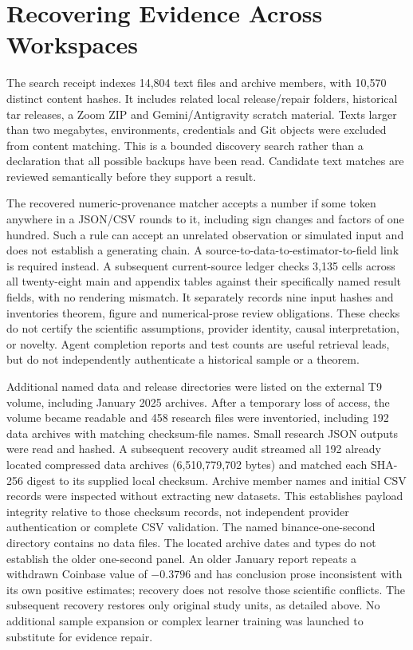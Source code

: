\section{Recovering Evidence Across Workspaces}
The search receipt indexes 14,804 text files and archive members, with 10,570 distinct content hashes. It includes related local release/repair folders, historical tar releases, a Zoom ZIP and Gemini/Antigravity scratch material. Texts larger than two megabytes, environments, credentials and Git objects were excluded from content matching. This is a bounded discovery search rather than a declaration that all possible backups have been read. Candidate text matches are reviewed semantically before they support a result.

The recovered numeric-provenance matcher accepts a number if some token anywhere in a JSON/CSV rounds to it, including sign changes and factors of one hundred. Such a rule can accept an unrelated observation or simulated input and does not establish a generating chain. A source-to-data-to-estimator-to-field link is required instead. A subsequent current-source ledger checks 3,135 cells across all twenty-eight main and appendix tables against their specifically named result fields, with no rendering mismatch. It separately records nine input hashes and inventories theorem, figure and numerical-prose review obligations. These checks do not certify the scientific assumptions, provider identity, causal interpretation, or novelty. Agent completion reports and test counts are useful retrieval leads, but do not independently authenticate a historical sample or a theorem.

Additional named data and release directories were listed on the external T9 volume, including January 2025 archives. After a temporary loss of access, the volume became readable and 458 research files were inventoried, including 192 data archives with matching checksum-file names. Small research JSON outputs were read and hashed. A subsequent recovery audit streamed all 192 already located compressed data archives (6,510,779,702 bytes) and matched each SHA-256 digest to its supplied local checksum. Archive member names and initial CSV records were inspected without extracting new datasets. This establishes payload integrity relative to those checksum records, not independent provider authentication or complete CSV validation. The named binance-one-second directory contains no data files. The located archive dates and types do not establish the older one-second panel. An older January report repeats a withdrawn Coinbase value of $-0.3796$ and has conclusion prose inconsistent with its own positive estimates; recovery does not resolve those scientific conflicts. The subsequent recovery restores only original study units, as detailed above. No additional sample expansion or complex learner training was launched to substitute for evidence repair.

